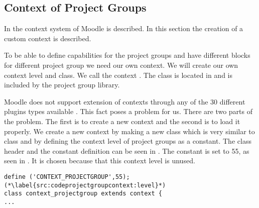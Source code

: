 \subsection{Context of Project Groups}
In   the context system of Moodle is described.
In this section the creation of a custom context is described. 

To be able to define capabilities for the project groups and have different blocks for different project group we need our own context.
We will create our own context level and class.
We call the context . 
The class is located in  and is included by the project group library. 

Moodle does not support extension of contexts through any of the 30 different plugins types available \cite{plugin}. 
This fact poses a problem for us.
There are two parts of the problem.
The first is to create a new context and the second is to load it properly. 
We create a new context by making a new class which is very similar to  class and by defining the context level of project groups as a constant. 
The class header and the constant definition can be seen in . 
The constant is set to 55, as seen in .
It is chosen because that this context level is unused.

\begin{lstlisting}[style=phpCode, caption=\myCaption{The context\_projectgroup class header and constant definition}, label=src:codeprojectgroupcontext]
define ('CONTEXT_PROJECTGROUP',55); (*\label{src:codeprojectgroupcontext:level}*)
class context_projectgroup extends context {
...
\end{lstlisting}

